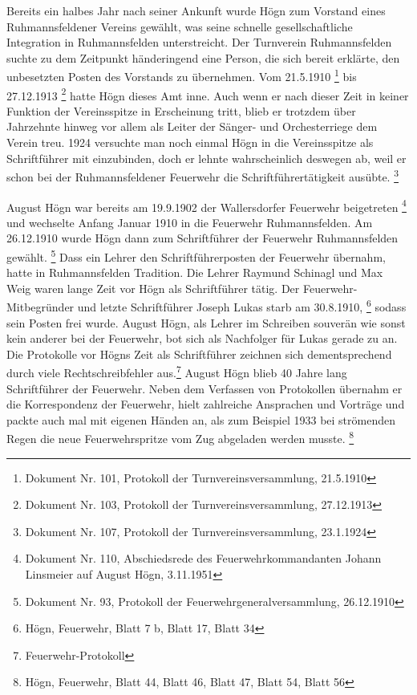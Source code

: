 Bereits ein halbes Jahr nach seiner Ankunft wurde Högn zum Vorstand
eines Ruhmannsfeldener Vereins gewählt, was seine schnelle
gesellschaftliche Integration in Ruhmannsfelden unterstreicht. Der
Turnverein Ruhmannsfelden suchte zu dem Zeitpunkt händeringend eine
Person, die sich bereit erklärte, den unbesetzten Posten des Vorstands
zu übernehmen. Vom 21.5.1910 \footnote{Dokument Nr. 101, Protokoll der
Turnvereinsversammlung, 21.5.1910}  bis 27.12.1913 \footnote{Dokument
Nr. 103, Protokoll der Turnvereinsversammlung, 27.12.1913} hatte Högn
dieses Amt inne. Auch wenn er nach dieser Zeit in keiner Funktion der
Vereinsspitze in Erscheinung tritt, blieb er trotzdem über Jahrzehnte
hinweg vor allem als Leiter der Sänger- und Orchesterriege dem Verein
treu. 1924 versuchte man noch einmal Högn in die Vereinsspitze als
Schriftführer mit einzubinden, doch er lehnte wahrscheinlich deswegen
ab, weil er schon bei der Ruhmannsfeldener Feuerwehr die
Schriftführertätigkeit ausübte. \footnote{Dokument Nr. 107, Protokoll
der Turnvereinsversammlung, 23.1.1924}

August Högn war bereits am 19.9.1902 der Wallersdorfer Feuerwehr
beigetreten \footnote{Dokument Nr. 110, Abschiedsrede des
Feuerwehrkommandanten Johann Linsmeier auf August Högn, 3.11.1951} und
wechselte Anfang Januar 1910 in die Feuerwehr Ruhmannsfelden. Am
26.12.1910 wurde Högn dann zum Schriftführer der Feuerwehr
Ruhmannsfelden gewählt. \footnote{Dokument Nr. 93, Protokoll der
Feuerwehrgeneralversammlung, 26.12.1910} Dass ein Lehrer den
Schriftführerposten der Feuerwehr übernahm, hatte in Ruhmannsfelden
Tradition. Die Lehrer Raymund Schinagl und Max Weig waren lange Zeit
vor Högn als Schriftführer tätig. Der Feuerwehr-Mitbegründer und letzte
Schriftführer Joseph Lukas starb am 30.8.1910, \footnote{Högn,
Feuerwehr, Blatt 7 b, Blatt 17, Blatt 34} sodass sein Posten frei
wurde. August Högn, als Lehrer im Schreiben souverän wie sonst kein
anderer bei der Feuerwehr, bot sich als Nachfolger für Lukas gerade zu
an. Die Protokolle vor Högns Zeit als Schriftführer zeichnen sich
dementsprechend durch viele Rechtschreibfehler aus.\footnote{
Feuerwehr-Protokoll} August Högn blieb 40 Jahre lang Schriftführer der
Feuerwehr. Neben dem Verfassen von Protokollen übernahm er die
Korrespondenz der Feuerwehr, hielt zahlreiche Ansprachen und Vorträge
und packte auch mal mit eigenen Händen an, als zum Beispiel 1933 bei
strömenden Regen die neue Feuerwehrspritze vom Zug abgeladen werden
musste. \footnote{Högn, Feuerwehr, Blatt 44, Blatt 46, Blatt 47, Blatt
54, Blatt 56}

